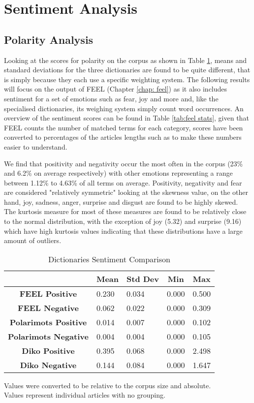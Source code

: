 \section{Sentiment Analysis}

\subsection{Polarity Analysis}

Looking at the scores for polarity on the corpus as shown in Table \ref{tab:dict stats}, means and standard deviations for the three dictionaries are found to be quite different, that is simply because they each use a specific weighting system. The following results will focus on the output of FEEL (Chapter \ref{chap: feel}) as it also includes sentiment for a set of emotions such as fear, joy and more and, like the specialised dictionaries, its weighing system simply count word occurrences. An overview of the sentiment scores can be found in Table \ref{tab:feel stats}, given that FEEL counts the number of matched terms for each category, scores have been converted to percentages of the articles lengths such as to make these numbers easier to understand. 

We find that positivity and negativity occur the most often in the corpus (23\% and 6.2\% on average respectively) with other emotions representing a range between 1.12\% to 4.63\% of all terms on average. Positivity, negativity and fear are considered "relatively symmetric" looking at the skewness value, on the other hand, joy, sadness, anger, surprise and disgust are found to be highly skewed. The kurtosis measure for most of these measures are found to be relatively close to the normal distribution, with the exception of joy (5.32) and surprise (9.16) which have high kurtosis values indicating that these distributions have a large amount of outliers.

\begin{table}[H]
\centering
\begin{tabular}{@{}|c|llll|@{}}
\toprule
 & \multicolumn{1}{c}{\textbf{Mean}} & \multicolumn{1}{c}{\textbf{Std Dev}} & \multicolumn{1}{c}{\textbf{Min}} & \multicolumn{1}{c|}{\textbf{Max}} \\ \midrule
\textbf{FEEL Positive} & 0.230 & 0.034 & 0.000 & 0.500 \\
\textbf{FEEL Negative} & 0.062 & 0.022 & 0.000 & 0.309 \\
\textbf{Polarimots Positive} & 0.014 & 0.007 & 0.000 & 0.102 \\
\textbf{Polarimots Negative} & 0.004 & 0.004 & 0.000 & 0.105 \\
\textbf{Diko Positive} & 0.395 & 0.068 & 0.000 & 2.498 \\
\textbf{Diko Negative} & 0.144 & 0.084 & 0.000 & 1.647 \\ \bottomrule
\end{tabular}
\caption{Dictionaries Sentiment Comparison}
Values were converted to be relative to the corpus size and absolute.\\Values represent individual articles with no grouping.
\label{tab:dict stats}
\end{table}


